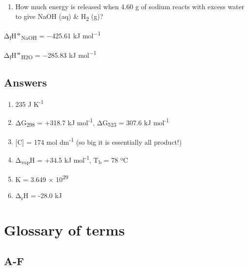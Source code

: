 \documentclass[
]{book}
\providecommand{\tightlist}{%
  \setlength{\itemsep}{0pt}\setlength{\parskip}{0pt}}
\begin{document}
\begin{enumerate}
\def\labelenumi{\arabic{enumi}.}
\setcounter{enumi}{5}
\tightlist
\item
  How much energy is released when 4.60 g of sodium reacts with excess water to give NaOH (aq) \& H\textsubscript{2} (g)?
\end{enumerate}

Δ\textsubscript{f}H\textsuperscript{⦵}\textsubscript{NaOH} = −425.61 kJ mol\textsuperscript{−1}

Δ\textsubscript{f}H\textsuperscript{⦵}\textsubscript{H2O} = −285.83 kJ mol\textsuperscript{−1}

\hypertarget{answers-2}{%
\section{Answers}\label{answers-2}}

\begin{enumerate}
\def\labelenumi{\arabic{enumi}.}
\item
  235 J K\textsuperscript{-1}
\item
  ΔG\textsubscript{298} = +318.7 kJ mol\textsuperscript{-1}, ΔG\textsubscript{523} = 307.6 kJ mol\textsuperscript{-1}
\item
  {[}C{]} = 174 mol dm\textsuperscript{-1} (so big it is essentially all product!)
\item
  Δ\textsubscript{vap}H = +34.5 kJ mol\textsuperscript{-1}, T\textsubscript{b} = 78 ºC
\item
  K = 3.649 × 10\textsuperscript{29}
\item
  Δ\textsubscript{r}H = -28.0 kJ
\end{enumerate}

\hypertarget{glossary-of-terms}{%
\chapter*{Glossary of terms}\label{glossary-of-terms}}

\hypertarget{a-f}{%
\section*{A-F}\label{a-f}}
\end{document}
